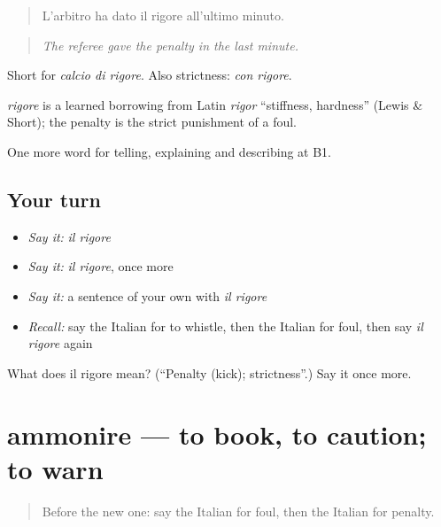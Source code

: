 \begin{quote}
L'arbitro ha dato il rigore all'ultimo minuto.
\end{quote}

\begin{quote}
\emph{The referee gave the penalty in the last minute.}
\end{quote}

Short for \emph{calcio di rigore}. Also strictness: \emph{con rigore}.

\begin{cousinweb}
\emph{rigore} is a learned borrowing from Latin \emph{rigor} \textquotedblleft{}stiffness, hardness\textquotedblright{} (Lewis \& Short); the penalty is the strict punishment of a foul.
\end{cousinweb}

\begin{grammarlens}[title={What you've built}]
One more word for telling, explaining and describing at B1.
\end{grammarlens}

\subsection*{Your turn}
\begin{itemize}
\raggedright
  \item \emph{Say it:} \emph{il rigore}
  \item \emph{Say it:} \emph{il rigore}, once more
  \item \emph{Say it:} a sentence of your own with \emph{il rigore}
  \item \emph{Recall:} say the Italian for to whistle, then the Italian for foul, then say \emph{il rigore} again
\end{itemize}

\begin{tcolorbox}[breakable,colback=teal!4,colframe=teal!35!black,title={Before you move on}]
What does il rigore mean? (\textquotedblleft{}Penalty (kick); strictness\textquotedblright{}.) Say it once more.
\end{tcolorbox}
\section[ammonire]{ammonire — to book, to caution; to warn}

\label{lesson:IT-C509-ammonire}



\begin{quote}
Before the new one: say the Italian for foul, then the Italian for penalty.
\end{quote}

